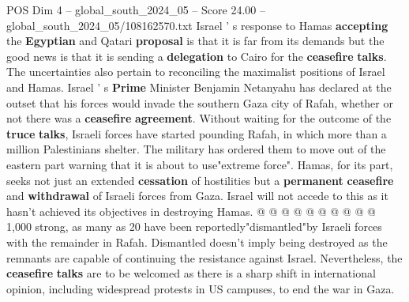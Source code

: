 \begin{textsample}{POS Dim 4 – global\_south\_2024\_05 – Score 24.00 – global\_south\_2024\_05/108162570.txt}
Israel ' s response to Hamas \textbf{accepting} the \textbf{Egyptian} and Qatari \textbf{proposal} is that it is far from its demands but the good news is that it is sending a \textbf{delegation} to Cairo for the \textbf{ceasefire} \textbf{talks}.
The uncertainties also pertain to reconciling the maximalist positions of Israel and Hamas.
Israel ' s \textbf{Prime} Minister Benjamin Netanyahu has declared at the outset that his forces would invade the southern Gaza city of Rafah, whether or not there was a \textbf{ceasefire} \textbf{agreement}.
Without waiting for the outcome of the \textbf{truce} \textbf{talks}, Israeli forces have started pounding Rafah, in which more than a million Palestinians shelter.
The military has ordered them to move out of the eastern part warning that it is about to use"extreme force".
Hamas, for its part, seeks not just an extended \textbf{cessation} of hostilities but a \textbf{permanent} \textbf{ceasefire} and \textbf{withdrawal} of Israeli forces from Gaza.
Israel will not accede to this as it hasn't achieved its objectives in destroying Hamas. @ @ @ @ @ @ @ @ @ @ 1,000 strong, as many as 20 have been reportedly"dismantled"by Israeli forces with the remainder in Rafah.
Dismantled doesn't imply being destroyed as the remnants are capable of continuing the resistance against Israel.
Nevertheless, the \textbf{ceasefire} \textbf{talks} are to be welcomed as there is a sharp shift in international opinion, including widespread protests in US campuses, to end the war in Gaza.

\end{textsample}
